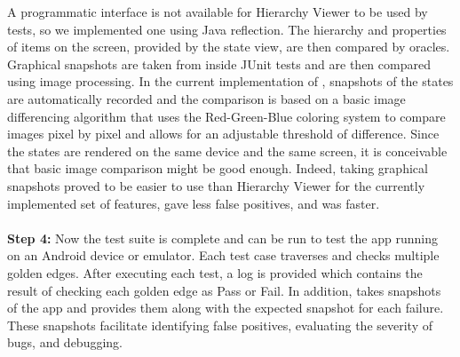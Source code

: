 A programmatic interface is not available for Hierarchy Viewer to be used by tests, so we implemented one using Java reflection. The hierarchy and properties of items on the screen, provided by the state view, are then compared by oracles.
\\
\indent
Graphical snapshots are taken from inside JUnit tests and are then compared using image processing. In the current implementation of \tool{}, snapshots of the states are automatically recorded and the comparison is based on a basic image differencing algorithm that uses the Red-Green-Blue coloring system to compare images pixel by pixel and allows for an adjustable threshold of difference.
Since the states are rendered on the same device and the same screen, it is conceivable that basic image comparison might be good enough. Indeed, taking graphical snapshots proved to be easier to use than Hierarchy Viewer for the currently implemented set of features, gave less false positives, and was faster.
\\
%
\indent
\\
\indent
{\bf Step 4:}
Now the test suite is complete and can be run to test the app running on an Android device or emulator.
Each test case traverses and checks multiple golden edges. After executing each test, a log is provided which contains the result of checking each golden edge as Pass or Fail. In addition, \tool{} takes snapshots of the app and provides them along with the expected snapshot for each failure. These snapshots facilitate identifying false positives, evaluating the severity of bugs, and debugging.
